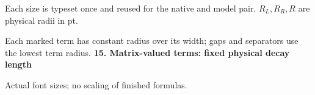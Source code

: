 \documentclass{article}
\newcommand\Mark[1]{\directlua{grid.mark(#1)}}
\begin{document}
\par\medskip
Each size is typeset once and reused for the native and model pair. $R_L,R_R,R$ are physical radii in pt.\par
Each marked term has constant radius over its width; gaps and separators use the lowest term radius.
\newpage
{\Large\bfseries 15. Matrix-valued terms: fixed physical decay length}\par\medskip
{} Actual font sizes; no scaling of finished formulas.\par\medskip
\end{document}
